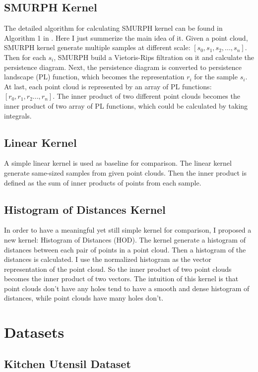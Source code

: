 \documentclass[10pt]{article}
\begin{document}
\subsection{SMURPH Kernel}
The detailed algorithm for calculating SMURPH kernel can be found in Algorithm 1 in \cite{zhu2016stochastic}.
Here I just summerize the main idea of it.
Given a point cloud, SMURPH kernel generate multiple samples at different scale: $[s_0,s_1,s_2, ..., s_n]$.
Then for each $s_i$, SMURPH build a Vietoris-Rips filtration on it and calculate the persistence diagram.
Next, the persistence diagram is converted to persistence landscape (PL) function, which becomes the representation $r_i$ for the sample $s_i$.
At last, each point cloud is represented by an array of PL functions: $[r_0, r_1, r_2..., r_n]$.
The inner product of two different point clouds becomes the inner product of two array of PL functions, which could be calculated by taking integrals.

\subsection{Linear Kernel}

A simple linear kernel is used as baseline for comparison. 
The linear kernel generate same-sized samples from given point clouds.
Then the inner product is defined as the sum of inner products of points from each sample.

\subsection{Histogram of Distances Kernel}

In order to have a meaningful yet still simple kernel for comparison,
I proposed a new kernel: Histogram of Distances (HOD).
The kernel generate a histogram of distances between each pair of points in a point cloud.
Then a histogram of the distances is calculated.
I use the normalized histogram as the vector representation of the point cloud.
So the inner product of two point clouds becomes the inner product of two vectors.
The intuition of this kernel is that point clouds don't have any holes tend to have a smooth and dense histogram of distances, while point clouds have many holes don't.


\section{Datasets}

\subsection{Kitchen Utensil Dataset}
\end{document}
